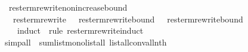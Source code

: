 \ res{\isacharunderscore}term{\isacharunderscore}rewrite{\isacharunderscore}non{\isacharunderscore}increase{\isacharunderscore}bound{\isacharcolon}\isanewline
\ \ {\isachardoublequoteopen}res{\isacharunderscore}term{\isacharunderscore}rewrite\ \ {\isasymLongrightarrow}\ res{\isacharunderscore}term{\isacharunderscore}rewrite{\isacharunderscore}bound\ \ {\isasymle}\ res{\isacharunderscore}term{\isacharunderscore}rewrite{\isacharunderscore}bound\ \isanewline
\ \ \ {\isacharparenleft}induct\ \ rule{\isacharcolon}\ res{\isacharunderscore}term{\isacharunderscore}rewrite{\isachardot}induct{\isacharparenright}\isanewline
{}simp{\isacharunderscore}all\ \ sum{\isacharunderscore}list{\isacharunderscore}mono{\isacharunderscore}list{\isacharunderscore}all{}\ list{\isacharunderscore}all{}{\isacharunderscore}conv{\isacharunderscore}all{\isacharunderscore}nth{\isacharparenright}%

